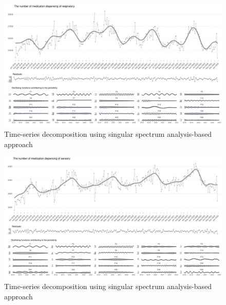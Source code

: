 \documentclass[
  letterpaper,
  DIV=11,
  numbers=noendperiod]{scrartcl}
\begin{document}
\begin{figure}[H]

{\centering \includegraphics[width=1\linewidth,height=\textheight,keepaspectratio]{supplementary_files/figure-pdf/unnamed-chunk-2-21.pdf}

}

\caption{Time-series decomposition using singular spectrum
analysis-based approach}

\end{figure}%

\begin{figure}[H]

{\centering \includegraphics[width=1\linewidth,height=\textheight,keepaspectratio]{supplementary_files/figure-pdf/unnamed-chunk-2-22.pdf}

}

\caption{Time-series decomposition using singular spectrum
analysis-based approach}

\end{figure}%
\end{document}
